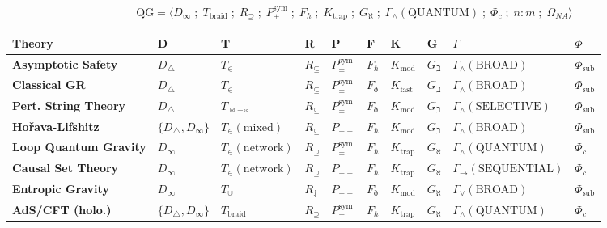 \documentclass[12pt,a4paper]{article}
\begin{document}
\[\text{QG} = \langle D_{\infty} \;;\; T_{\text{braid}} \;;\; R_{\supseteq} \;;\; P_{\pm}^{\text{sym}} \;;\; F_{\hbar} \;;\; K_{\text{trap}} \;;\; G_{\aleph} \;;\; \Gamma_{\wedge}(\text{QUANTUM}) \;;\; \Phi_{c} \;;\; n{:}m \;;\; \Omega_{NA} \rangle\]

\begin{table}[htbp]
\centering
\small
{}
\begin{tabularx}{\textwidth}{>{\centering\arraybackslash}X >{\centering\arraybackslash}X >{\centering\arraybackslash}X >{\centering\arraybackslash}X >{\centering\arraybackslash}X >{\centering\arraybackslash}X >{\centering\arraybackslash}X >{\centering\arraybackslash}X >{\centering\arraybackslash}X >{\centering\arraybackslash}X}
\toprule
\rowcolor{gray!25}\textbf{Theory} & \textbf{D} & \textbf{T} & \textbf{R} & \textbf{P} & \textbf{F} & \textbf{K} & \textbf{G} & \textbf{$\Gamma$} & \textbf{$\Phi$} \\
\midrule
\rowcolors{1}{white}{gray!10}
\textbf{Asymptotic Safety} & $D_{\triangle}$ & $T_{\in}$ & $R_{\subseteq}$ & $P_{\pm}^{\text{sym}}$ & $F_{\hbar}$ & $K_{\text{mod}}$ & $G_{\beth}$ & $\Gamma_{\wedge}(\text{BROAD})$ & $\Phi_{\text{sub}}$ \\
\textbf{Classical GR} & $D_{\triangle}$ & $T_{\in}$ & $R_{\subseteq}$ & $P_{\pm}^{\text{sym}}$ & $F_{\eth}$ & $K_{\text{fast}}$ & $G_{\beth}$ & $\Gamma_{\wedge}(\text{BROAD})$ & $\Phi_{\text{sub}}$ \\
\textbf{Pert. String Theory} & $D_{\triangle}$ & $T_{\bowtie + \square\square}$ & $R_{\subseteq}$ & $P_{\pm}^{\text{sym}}$ & $F_{\eth}$ & $K_{\text{mod}}$ & $G_{\beth}$ & $\Gamma_{\wedge}(\text{SELECTIVE})$ & $\Phi_{\text{sub}}$ \\
\textbf{Hořava-Lifshitz} & $\{D_{\triangle}, D_{\infty}\}$ & $T_{\in}(\text{mixed})$ & $R_{\subseteq}$ & $P_{+-}$ & $F_{\hbar}$ & $K_{\text{mod}}$ & $G_{\beth}$ & $\Gamma_{\wedge}(\text{BROAD})$ & $\Phi_{\text{sub}}$ \\
\textbf{Loop Quantum Gravity} & $D_{\infty}$ & $T_{\in}(\text{network})$ & $R_{\supseteq}$ & $P_{\pm}^{\text{sym}}$ & $F_{\hbar}$ & $K_{\text{trap}}$ & $G_{\aleph}$ & $\Gamma_{\wedge}(\text{QUANTUM})$ & $\Phi_{c}$ \\
\textbf{Causal Set Theory} & $D_{\infty}$ & $T_{\in}(\text{network})$ & $R_{\supseteq}$ & $P_{+-}$ & $F_{\hbar}$ & $K_{\text{trap}}$ & $G_{\aleph}$ & $\Gamma_{\to}(\text{SEQUENTIAL})$ & $\Phi_{c}$ \\
\textbf{Entropic Gravity} & $D_{\infty}$ & $T_{\cup}$ & $R_{\ddagger}$ & $P_{+-}$ & $F_{\eth}$ & $K_{\text{mod}}$ & $G_{\aleph}$ & $\Gamma_{\vee}(\text{BROAD})$ & $\Phi_{\text{sub}}$ \\
\textbf{AdS/CFT (holo.)} & $\{D_{\triangle}, D_{\infty}\}$ & $T_{\text{braid}}$ & $R_{\supseteq}$ & $P_{\pm}^{\text{sym}}$ & $F_{\hbar}$ & $K_{\text{trap}}$ & $G_{\aleph}$ & $\Gamma_{\wedge}(\text{QUANTUM})$ & $\Phi_{c}$ \\
\bottomrule
\end{tabularx}
\end{table}
\end{document}
